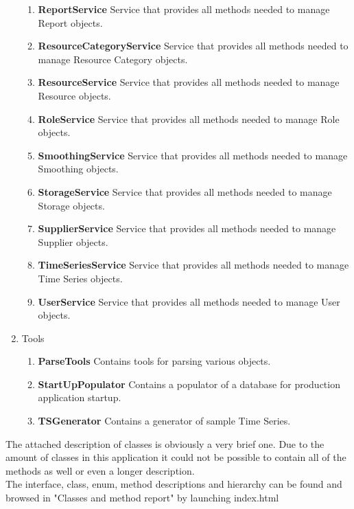 \documentclass[a4paper,11pt,twoside]{report}
\theoremstyle{definition}
\begin{document}
\begin{enumerate}
\begin{enumerate}
\item \textbf{ReportService} Service that provides all methods needed to manage Report objects.
\item \textbf{ResourceCategoryService} Service that provides all methods needed to manage Resource Category objects.
\item \textbf{ResourceService} Service that provides all methods needed to manage Resource objects.
\item \textbf{RoleService} Service that provides all methods needed to manage Role objects.

\item \textbf{SmoothingService} Service that provides all methods needed to manage Smoothing objects.
 \item \textbf{StorageService} Service that provides all methods needed to manage Storage objects.

\item \textbf{SupplierService} Service that provides all methods needed to manage Supplier objects.
\item \textbf{TimeSeriesService} Service that provides all methods needed to manage Time Series objects.

\item \textbf{UserService} Service that provides all methods needed to manage User objects.


\end{enumerate} 
\item Tools
\begin{enumerate} 
\item \textbf{ParseTools} Contains tools for parsing various objects.
\item \textbf{StartUpPopulator} Contains a populator of a database for production application startup.

\item \textbf{TSGenerator} Contains a generator of sample Time Series.



\end{enumerate}
\end{enumerate}

The attached description of classes is obviously a very brief one. Due to the amount of classes in this application it could not be possible to contain all of the methods as well or even a longer description. \\
The interface, class, enum, method descriptions and hierarchy can be found and browsed in "Classes and method report" by launching index.html
\end{document}
